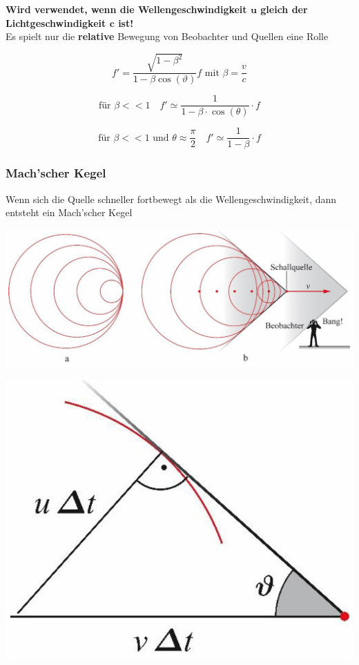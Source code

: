\textbf{Wird verwendet, wenn die Wellengeschwindigkeit $\boldsymbol{u}$ gleich der Lichtgeschwindigkeit $\boldsymbol{c}$ ist!} \\

Es spielt nur die \textbf{relative} Bewegung von Beobachter und Quellen eine Rolle

$$ \boxed{f' = \frac{\sqrt{1-\beta^2}}{1 - \beta \cos(\vartheta)}f \text{ mit } \beta = \frac{v}{c} } $$


$$ \text{für } \beta << 1 \quad f' \simeq \frac{1}{1- \beta \cdot \cos(\theta)} \cdot f  $$

$$ \text{für } \beta << 1 \text{ und } \theta \approx \frac{\pi}{2} \quad f' \simeq \frac{1}{1- \beta } \cdot f $$



\subsubsection{Mach'scher Kegel}
Wenn sich die Quelle schneller fortbewegt als die Wellengeschwindigkeit, dann entsteht ein Mach'scher Kegel \\



\begin{minipage}{0.6\linewidth}
\includegraphics[width=0.95\linewidth]{Bilder/Wellen-Optik/machkegel_1} \\
\end{minipage}
\hfill
\begin{minipage}{0.38\linewidth}
\includegraphics[width=0.95\linewidth]{Bilder/Wellen-Optik/machkegel_2} \\
\end{minipage}


